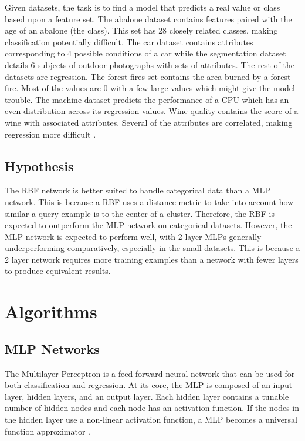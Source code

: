 \documentclass[twoside,10pt]{article}
\begin{document}
Given datasets, the task is to find a model that predicts a real value or class based upon a feature set. The abalone dataset contains features paired with the age of an abalone (the class). This set has 28 closely related classes, making classification potentially difficult. 
The car dataset contains attributes corresponding to 4 possible conditions of a car while the segmentation dataset details 6 subjects of outdoor photographs with sets of attributes. 
The rest of the datasets are regression. 
The forest fires set contains the area burned by a forest fire. Most of the values are 0 with a few large values which might give the model trouble.
The machine dataset predicts the performance of a CPU which has an even distribution across its regression values. Wine quality contains the score of a wine with associated attributes. Several of the attributes are correlated, making regression more difficult \citep{datasets}.

\subsection{Hypothesis}

The RBF network is better suited to handle categorical data than a MLP network. This is because a RBF uses a distance metric to take into account how similar a query example is to the center of a cluster.
Therefore, the RBF is expected to outperform the MLP network on categorical datasets.
However, the MLP network is expected to perform well, with 2 layer MLPs generally underperforming comparatively, especially in the small datasets. This is because a 2 layer network requires more training examples than a network with fewer layers to produce equivalent results.

\section{Algorithms}

\subsection{MLP Networks}
The Multilayer Perceptron is a feed forward neural network that can be used for both classification and regression.
At its core, the MLP is composed of an input layer, hidden layers, and an output layer. Each hidden layer contains a tunable number of hidden nodes and each node has an activation function. If the nodes in the hidden layer use a non-linear activation function, a MLP becomes a universal function approximator \citep{svozil1997ffnn}.
\end{document}
